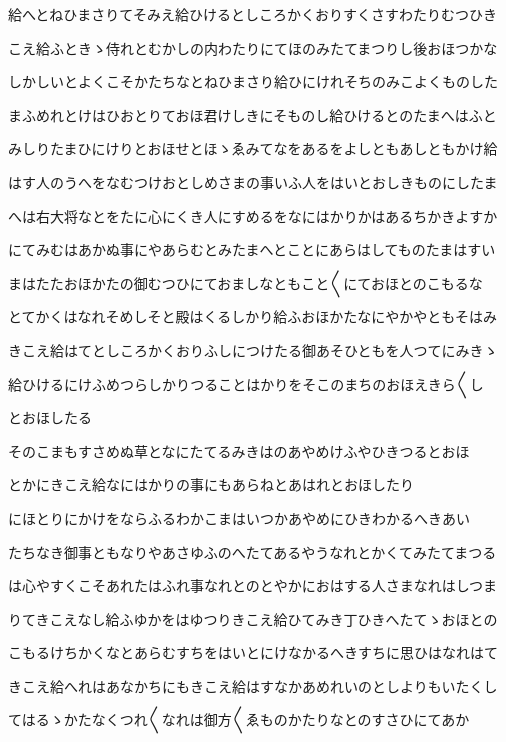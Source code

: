 \documentclass[a4paper,11pt,landscape]{ltjtarticle}
\begin{document}
給へとねひまさりてそみえ給ひけるとしころかくおりすくさすわたりむつひき
\par\medskip
こえ給ふときゝ侍れとむかしの内わたりにてほのみたてまつりし後おほつかな
\par\medskip
しかしいとよくこそかたちなとねひまさり給ひにけれそちのみこよくものした
\par\medskip
まふめれとけはひおとりておほ君けしきにそものし給ひけるとのたまへはふと
\par\medskip
みしりたまひにけりとおほせとほゝゑみてなをあるをよしともあしともかけ給
\par\medskip
はす人のうへをなむつけおとしめさまの事いふ人をはいとおしきものにしたま
\par\medskip
へは右大将なとをたに心にくき人にすめるをなにはかりかはあるちかきよすか
\par\medskip
にてみむはあかぬ事にやあらむとみたまへとことにあらはしてものたまはすい
\par\medskip
まはたたおほかたの御むつひにておましなともこと〱にておほとのこもるな
\par\medskip
とてかくはなれそめしそと殿はくるしかり給ふおほかたなにやかやともそはみ
\par\medskip
きこえ給はてとしころかくおりふしにつけたる御あそひともを人つてにみきゝ
\par\medskip
給ひけるにけふめつらしかりつることはかりをそこのまちのおほえきら〱し
\par\medskip
とおほしたる
\par\medskip
そのこまもすさめぬ草となにたてるみきはのあやめけふやひきつるとおほ
\par\medskip
とかにきこえ給なにはかりの事にもあらねとあはれとおほしたり
\par\medskip
にほとりにかけをならふるわかこまはいつかあやめにひきわかるへきあい
\par\medskip
たちなき御事ともなりやあさゆふのへたてあるやうなれとかくてみたてまつる
\par\medskip
は心やすくこそあれたはふれ事なれとのとやかにおはする人さまなれはしつま
\par\medskip
りてきこえなし給ふゆかをはゆつりきこえ給ひてみき丁ひきへたてゝおほとの
\par\medskip
こもるけちかくなとあらむすちをはいとにけなかるへきすちに思ひはなれはて
\par\medskip
きこえ給へれはあなかちにもきこえ給はすなかあめれいのとしよりもいたくし
\par\medskip
てはるゝかたなくつれ〱なれは御方〱ゑものかたりなとのすさひにてあか
\par\medskip
\end{document}
